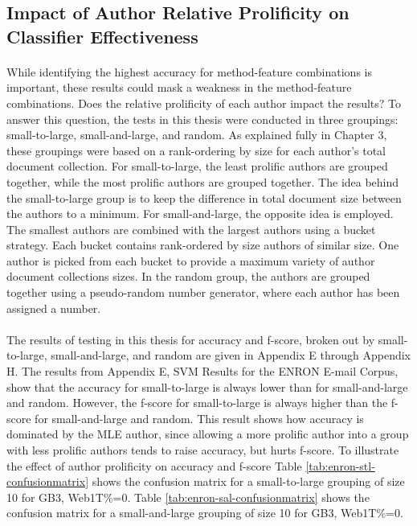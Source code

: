 \begin{singlespace}
\section{Impact of Author Relative Prolificity on Classifier Effectiveness}
\end{singlespace}
	\paragraph*{} While identifying the highest accuracy for method-feature combinations is important, these results could mask a weakness in the method-feature combinations.  Does the relative prolificity of each author impact the results?  To answer this question, the tests in this thesis were conducted in three groupings: small-to-large, small-and-large, and random.  As explained fully in Chapter 3, these groupings were based on a rank-ordering by size for each author's total document collection.  For small-to-large, the least prolific authors are grouped together, while the most prolific authors are grouped together. The idea behind the small-to-large group is to keep the difference in total document size between the authors to a minimum. For small-and-large, the opposite idea is employed.  The smallest authors are combined with the largest authors using a bucket strategy.  Each bucket contains rank-ordered by size authors of similar size.  One author is picked from each bucket to provide a maximum variety of author document collections sizes.  In the random group, the authors are grouped together using a pseudo-random number generator, where each author has been assigned a number.
	\paragraph*{} The results of testing in this thesis for accuracy and f-score, broken out by small-to-large, small-and-large, and random are given in Appendix E through Appendix H.  The results from Appendix E, SVM Results for the ENRON E-mail Corpus, show that the accuracy for small-to-large is always lower than for small-and-large and random.  However, the f-score for small-to-large is always higher than the f-score for small-and-large and random.  This result shows how accuracy is dominated by the MLE author, since allowing a more prolific author into a group with less prolific authors tends to raise accuracy, but hurts f-score. To illustrate the effect of author prolificity on accuracy and f-score Table \ref{tab:enron-stl-confusionmatrix} shows the confusion matrix for a small-to-large grouping of size 10 for GB3, Web1T\%=0.  Table \ref{tab:enron-sal-confusionmatrix} shows the confusion matrix for a small-and-large grouping of size 10 for GB3, Web1T\%=0. 
	
